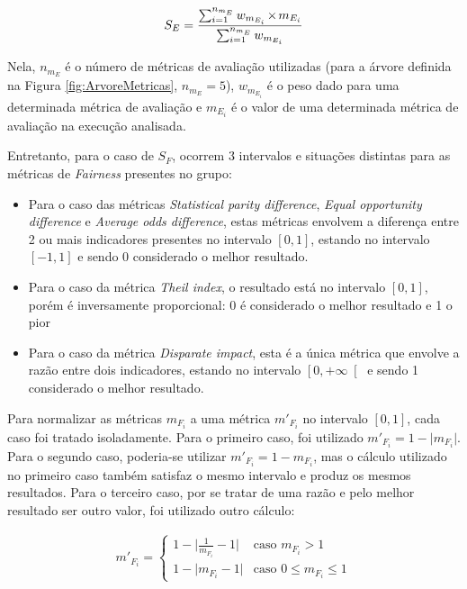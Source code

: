 \documentclass[Portugues,Final]{ic-tese-v3}
\let\oldtimes\times
\def\times{{\mkern1mu\oldtimes\mkern1mu}}
\begin{document}
\begin{equation}
\label{eqn:EvaluationScore}
	\begin{aligned}
	S_{E} = \frac{\sum_{i=1}^{n_{m_E}} w_{m_{E_i}} \times m_{E_{i}}}{\sum_{i=1}^{n_{m_E}} w_{m_{E_i}}}
	\end{aligned}
\end{equation}

Nela, $n_{m_E}$ é o número de métricas de avaliação utilizadas (para a árvore definida na Figura \ref{fig:ArvoreMetricas}, $n_{m_E} = 5$), $w_{m_{E_i}}$ é o peso dado para uma determinada métrica de avaliação e $m_{E_{i}}$ é o valor de uma determinada métrica de avaliação na execução analisada.

Entretanto, para o caso de $S_F$, ocorrem 3 intervalos e situações distintas para as métricas de \textit{Fairness} presentes no grupo:

\begin{itemize}
	\item Para o caso das métricas \textit{Statistical parity difference}, \textit{Equal opportunity difference} e \textit{Average odds difference}, estas métricas envolvem a diferença entre 2 ou mais indicadores presentes no intervalo $\left[0,1 \right]$, estando no intervalo $\left[-1,1 \right]$ e sendo 0 considerado o melhor resultado.
	\item Para o caso da métrica \textit{Theil index}, o resultado está no intervalo $\left[0,1 \right]$, porém é inversamente proporcional: 0 é considerado o melhor resultado e 1 o pior
	\item Para o caso da métrica \textit{Disparate impact}, esta é a única métrica que envolve a razão entre dois indicadores, estando no intervalo $\left[0,+\infty \right[$ e sendo 1 considerado o melhor resultado.
\end{itemize}

Para normalizar as métricas $m_{F_i}$ a uma métrica $m'_{F_i}$ no intervalo $\left[0,1 \right]$, cada caso foi tratado isoladamente. Para o primeiro caso, foi utilizado $m'_{F_i} = 1-\lvert m_{F_i} \rvert$. Para o segundo caso, poderia-se utilizar $m'_{F_i} = 1-m_{F_i}$, mas o cálculo utilizado no primeiro caso também satisfaz o mesmo intervalo e produz os mesmos resultados. Para o terceiro caso, por se tratar de uma razão e pelo melhor resultado ser outro valor, foi utilizado outro cálculo:

\begin{equation}
\label{eqn:normalizationFairnessStep2}
	\begin{aligned}
	m'_{F_i} = 
	\begin{cases}
	1-\lvert \frac{1}{m_{F_i}}-1 \lvert & \text{caso $m_{F_i} > 1$}\\
	1-\lvert m_{F_i}-1 \lvert & \text{caso $0 \leqslant m_{F_i} \leqslant 1$}
	\end{cases}
	\end{aligned}
\end{equation}
\end{document}
